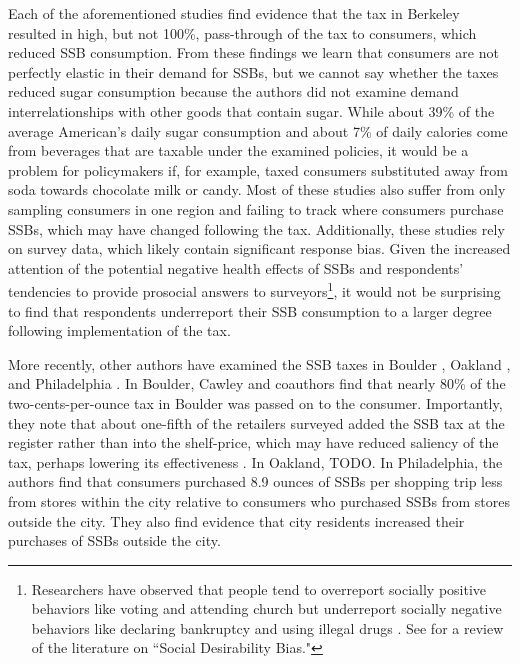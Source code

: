 \documentclass[12pt]{article}
\begin{document}
Each of the aforementioned studies find evidence that the tax in Berkeley resulted in high, but not 100\%, pass-through of the tax to consumers, which reduced SSB consumption. From these findings we learn that consumers are not perfectly elastic in their demand for SSBs, but we cannot say whether the taxes reduced sugar consumption because the authors did not examine demand interrelationships with other goods that contain sugar. While about 39\% of the average American's daily sugar consumption \parencite{dietary2015dietary} and about 7\% of daily calories \parencite{allcott2019should} come from beverages that are taxable under the examined policies, it would be a problem for policymakers if, for example, taxed consumers substituted away from soda towards chocolate milk or candy. Most of these studies also suffer from only sampling consumers in one region and failing to track where consumers purchase SSBs, which may have changed following the tax. Additionally, these studies rely on survey data, which likely contain significant response bias. Given the increased attention of the potential negative health effects of SSBs and respondents' tendencies to provide prosocial answers to surveyors\footnote{Researchers have observed that people tend to overreport socially positive behaviors like voting \parencite{silver1986overreports} and attending church \parencite{hadaway1993polls} but underreport socially negative behaviors like declaring bankruptcy \parencite{locander1976investigation} and using illegal drugs \parencite{mensch1988underreporting}. See \textcite{krumpal2013determinants} for a review of the literature on ``Social Desirability Bias."}, it would not be surprising to find that respondents underreport their SSB consumption to a larger degree following implementation of the tax.

More recently, other authors have examined the SSB taxes in Boulder \parencite{cawley2020boulder}, Oakland \parencite{cawley2020oakland}, and Philadelphia \parencite{cawley2020philly}. In Boulder, Cawley and coauthors find that nearly 80\% of the two-cents-per-ounce tax in Boulder was passed on to the consumer. Importantly, they note that about one-fifth of the retailers surveyed added the SSB tax at the register rather than into the shelf-price, which may have reduced saliency of the tax, perhaps lowering its effectiveness \parencite{chetty2009salience}. In Oakland, TODO. In Philadelphia, the authors find that consumers purchased 8.9 ounces of SSBs per shopping trip less from stores within the city relative to consumers who purchased SSBs from stores outside the city. They also find evidence that city residents increased their purchases of SSBs outside the city.
\end{document}
